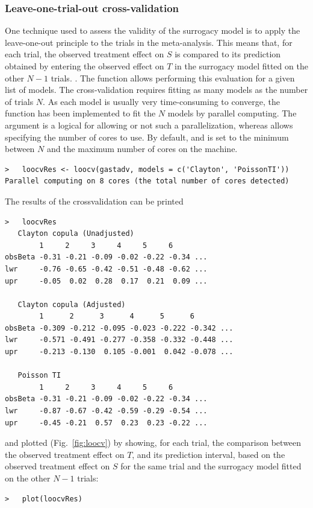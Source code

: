 \documentclass[]{scrartcl}\usepackage[]{graphicx}\usepackage[]{color}
\begin{document}
{{%
\subsubsection{Leave-one-trial-out cross-validation}
One technique used to assess the validity of the surrogacy model
  is to apply the leave-one-out principle to the trials in the meta-analysis.
This means that, for each trial, the observed treatment effect on $S$
  is compared to its prediction obtained by
  entering the observed effect on $T$
  in the surrogacy model fitted on the other $N-1$ trials.
\citep{Michiels09, Mauguen13, Rotolo17}.
The function  allows performing this evaluation for
  a given list of models.
The cross-validation requires fitting as many models as the number of trials $N$.
As each model is usually very time-consuming to converge,
  the function  has been implemented to
  fit the $N$ models by parallel computing.
The argument  is a logical for allowing or not such a parallelization,
  whereas  allows specifying the number of cores to use.
By default,  and  is set to the minimum
  between $N$ and the maximum number of cores on the machine.
\begin{lstlisting}
>   loocvRes <- loocv(gastadv, models = c('Clayton', 'PoissonTI'))
Parallel computing on 8 cores (the total number of cores detected)
\end{lstlisting}
The results of the crossvalidation can be printed
\begin{lstlisting}
>   loocvRes
   Clayton copula (Unadjusted) 
        1     2     3     4     5     6        
obsBeta -0.31 -0.21 -0.09 -0.02 -0.22 -0.34 ...
lwr     -0.76 -0.65 -0.42 -0.51 -0.48 -0.62 ...
upr     -0.05  0.02  0.28  0.17  0.21  0.09 ...

   Clayton copula (Adjusted) 
        1      2      3      4      5      6         
obsBeta -0.309 -0.212 -0.095 -0.023 -0.222 -0.342 ...
lwr     -0.571 -0.491 -0.277 -0.358 -0.332 -0.448 ...
upr     -0.213 -0.130  0.105 -0.001  0.042 -0.078 ...

   Poisson TI 
        1     2     3     4     5     6        
obsBeta -0.31 -0.21 -0.09 -0.02 -0.22 -0.34 ...
lwr     -0.87 -0.67 -0.42 -0.59 -0.29 -0.54 ...
upr     -0.45 -0.21  0.57  0.23  0.23 -0.22 ...
\end{lstlisting}
and plotted (Fig.~\ref{fig:loocv}) by showing, 
  for each trial, the comparison between the observed 
  treatment effect on $T$, and its prediction interval,
  based on the observed treatment effect on $S$ for the same trial
  and the surrogacy model fitted on the other $N-1$ trials:
\begin{lstlisting}
>   plot(loocvRes)
\end{lstlisting}

}}
\end{document}
